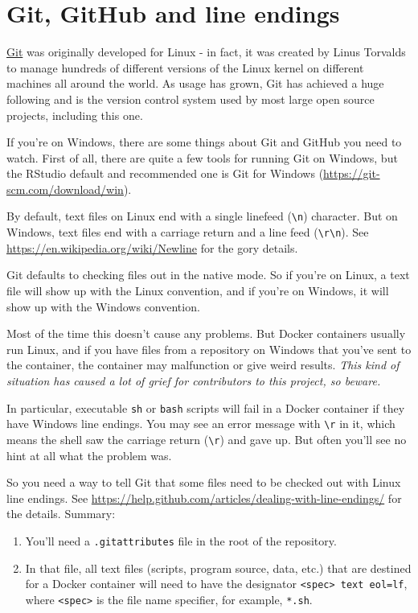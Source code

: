 \documentclass[]{book}
\providecommand{\tightlist}{%
  \setlength{\itemsep}{0pt}\setlength{\parskip}{0pt}}
\theoremstyle{definition}
\theoremstyle{definition}
\theoremstyle{definition}
\theoremstyle{remark}
\begin{document}
\hypertarget{git-github-and-line-endings}{%
\section{Git, GitHub and line
endings}\label{git-github-and-line-endings}}

\href{https://git-scm.com/}{Git} was originally developed for Linux - in
fact, it was created by Linus Torvalds to manage hundreds of different
versions of the Linux kernel on different machines all around the world.
As usage has grown, Git has achieved a huge following and is the version
control system used by most large open source projects, including this
one.

If you're on Windows, there are some things about Git and GitHub you
need to watch. First of all, there are quite a few tools for running Git
on Windows, but the RStudio default and recommended one is Git for
Windows (\url{https://git-scm.com/download/win}).

By default, text files on Linux end with a single linefeed
(\texttt{\textbackslash{}n}) character. But on Windows, text files end
with a carriage return and a line feed
(\texttt{\textbackslash{}r\textbackslash{}n}). See
\url{https://en.wikipedia.org/wiki/Newline} for the gory details.

Git defaults to checking files out in the native mode. So if you're on
Linux, a text file will show up with the Linux convention, and if you're
on Windows, it will show up with the Windows convention.

Most of the time this doesn't cause any problems. But Docker containers
usually run Linux, and if you have files from a repository on Windows
that you've sent to the container, the container may malfunction or give
weird results. \emph{This kind of situation has caused a lot of grief
for contributors to this project, so beware.}

In particular, executable \texttt{sh} or \texttt{bash} scripts will fail
in a Docker container if they have Windows line endings. You may see an
error message with \texttt{\textbackslash{}r} in it, which means the
shell saw the carriage return (\texttt{\textbackslash{}r}) and gave up.
But often you'll see no hint at all what the problem was.

So you need a way to tell Git that some files need to be checked out
with Linux line endings. See
\url{https://help.github.com/articles/dealing-with-line-endings/} for
the details. Summary:

\begin{enumerate}
\def\labelenumi{\arabic{enumi}.}
\tightlist
\item
  You'll need a \texttt{.gitattributes} file in the root of the
  repository.
\item
  In that file, all text files (scripts, program source, data, etc.)
  that are destined for a Docker container will need to have the
  designator \texttt{\textless{}spec\textgreater{}\ text\ eol=lf}, where
  \texttt{\textless{}spec\textgreater{}} is the file name specifier, for
  example, \texttt{*.sh}.
\end{enumerate}
\end{document}
